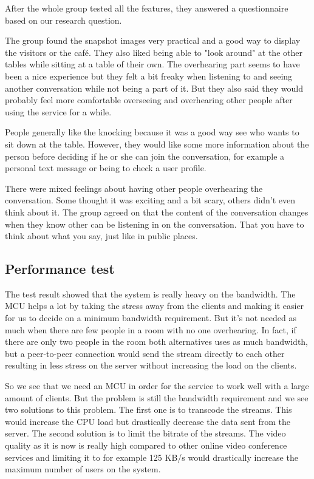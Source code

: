 \documentclass[12pt, titlepage]{article}
\begin{document}
After the whole group tested all the features, they answered a questionnaire based on our research question.

The group found the snapshot images very practical and a good way to display the visitors or the café. They also liked being able to "look around" at the other tables while sitting at a table of their own. The overhearing part seems to have been a nice experience but they felt a bit freaky when listening to and seeing another conversation while not being a part of it. But they also said they would probably feel more comfortable overseeing and overhearing other people after using the service for a while.

People generally like the knocking because it was a good way see who wants to sit down at the table. However, they would like some more information about the person before deciding if he or she can join the conversation, for example a personal text message or being to check a user profile.

There were mixed feelings about having other people overhearing the conversation. Some thought it was exciting and a bit scary, others didn't even think about it. The group agreed on that the content of the conversation changes when they know other can be listening in on the conversation. That you have to think about what you say, just like in public places.

\subsection{Performance test}
The test result showed that the system is really heavy on the bandwidth. The MCU helps a lot by taking the stress away from the clients and making it easier for us to decide on a minimum bandwidth requirement. But it's not needed as much when there are few people in a room with no one overhearing. In fact, if there are only two people in the room both alternatives uses as much bandwidth, but a peer-to-peer connection would send the stream directly to each other resulting in less stress on the server without increasing the load on the clients.

So we see that we need an MCU in order for the service to work well with a large amount of clients. But the problem is still the bandwidth requirement and we see two solutions to this problem. The first one is to transcode the streams. This would increase the CPU load but drastically decrease the data sent from the server. The second solution is to limit the bitrate of the streams. The video quality as it is now is really high compared to other online video conference services and limiting it to for example 125 KB/s would drastically increase the maximum number of users on the system.
\end{document}
